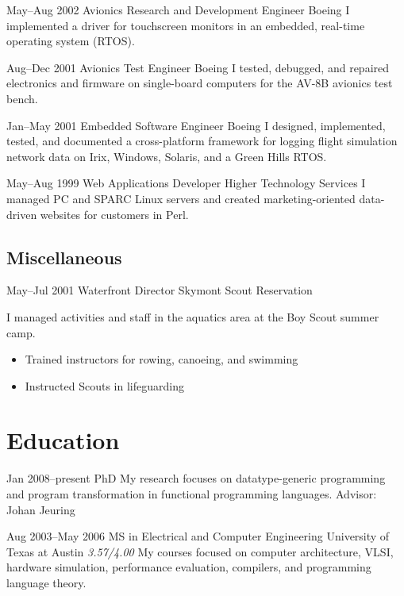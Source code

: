 \documentclass[11pt,a4paper,roman]{moderncv}
\begin{document}
\cventry%
{May--Aug 2002}%
{Avionics Research and Development Engineer}%
{Boeing}%
{\stlouis}%
{}%
{I implemented a driver for touchscreen monitors in an embedded, real-time operating system (RTOS).}

\cventry%
{Aug--Dec 2001}%
{Avionics Test Engineer}%
{Boeing}%
{\stlouis}%
{}%
{I tested, debugged, and repaired electronics and firmware on single-board computers for the AV-8B avionics test bench.}

\cventry%
{Jan--May 2001}%
{Embedded Software Engineer}%
{Boeing}%
{\stlouis}%
{}%
{I designed, implemented, tested, and documented a cross-platform \Cpp framework for logging flight simulation network data on Irix, Windows, Solaris, and a Green Hills RTOS.}

\cventry%
{May--Aug 1999}%
{Web Applications Developer}%
{Higher Technology Services}%
{\chattanooga}%
{}%
{I managed PC and SPARC Linux servers and created marketing-oriented data-driven websites for customers in Perl.}


\subsection{Miscellaneous}

\cventry%
{May--Jul 2001}%
{Waterfront Director}%
{Skymont Scout Reservation}%
{\altamont}%
{}%
{I managed activities and staff in the aquatics area at the Boy Scout summer camp.
\begin{itemize}
\item Trained instructors for rowing, canoeing, and swimming
\item Instructed Scouts in lifeguarding
\end{itemize}}


\section{Education}

\cventry%
{Jan 2008--present}%
{PhD}%
{\uu}%
{\utrecht}%
{}%
{My research focuses on datatype-generic programming and program transformation
in functional programming languages.\newline{}%
Advisor: Johan Jeuring}

\cventry%
{Aug 2003--May 2006}%
{MS in Electrical and Computer Engineering}%
{University of Texas at Austin}%
{\austin}%
{\textit{3.57/4.00}}%
{My courses focused on computer architecture, VLSI, hardware simulation,
performance evaluation, compilers, and programming language theory.}
\end{document}
